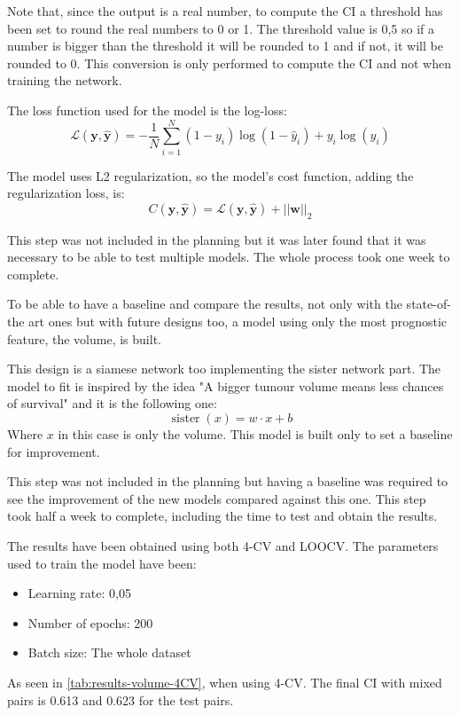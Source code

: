 Note that, since the output is a real number, to compute the \gls{CI} a threshold has been
set to round the real numbers to 0 or 1. The threshold value is 0,5 so if a number is 
bigger than the threshold it will be rounded to 1 and if not, it will be rounded to 0.
This conversion is only performed to compute the \gls{CI} and not when training the network.

The loss function used for the model is the log-loss:
\[
  \mathcal{L}(\bm{y}, \hat{\bm{y}}) = -\frac{1}{N} \sum_{i = 1}^{N}
  (1 - y_i)\log(1 - \hat{y}_i) + y_i\log(\hat{y}_i)
\]

The model uses L2 regularization, so the model's cost function, 
adding the regularization loss, is:
\[
  C(\bm{y}, \hat{\bm{y}}) = \mathcal{L}(\bm{y}, \hat{\bm{y}}) + 
  ||\bm{w}||_2
\]

This step was not included in the planning but it was later found that it was necessary to be 
able to test multiple models. The whole process took one week to complete.


To be able to have a baseline and compare the results, not only with the state-of-the art ones
but with future designs too, a model using only the most prognostic feature, the volume, is 
built.

This design is a siamese network too implementing the sister network part. The model to fit
is inspired by the idea "A bigger tumour volume means less chances of survival" 
and it is the following one:
\[
  \operatorname{sister}(x) = w\cdot x + b
\]
Where \( x \) in this case is only the volume. This model is built only to set a 
baseline for improvement.

This step was not included in the planning but having a baseline was required to see the 
improvement of the new models compared against this one. This step took half a week to complete,
including the time to test and obtain the results.


The results have been obtained using both 4-CV and \gls{LOOCV}. The parameters used to 
train the model have been:
\begin{itemize}
  \item Learning rate: 0,05
  \item Number of epochs: 200
  \item Batch size: The whole dataset
\end{itemize}

As seen in \autoref{tab:results-volume-4CV}, when using 4-CV. The final \gls{CI} with mixed pairs
is 0.613 and 0.623 for the test pairs.

